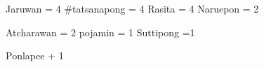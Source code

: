 Jaruwan = 4
#tatsanapong = 4 
Rasita = 4
Naruepon = 2


Atcharawan  = 2 
pojamin = 1
Suttipong =1

Ponlapee + 1